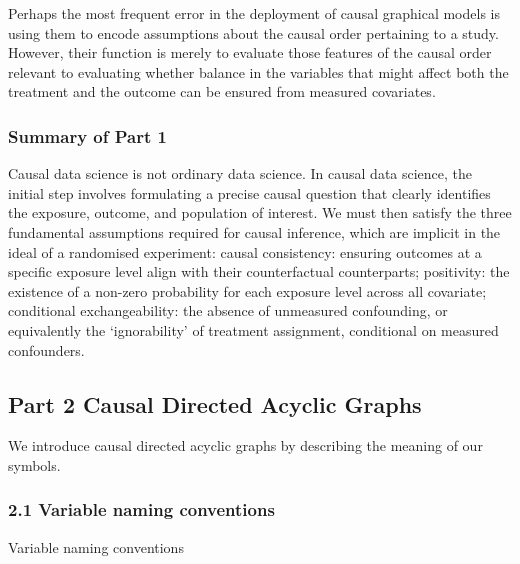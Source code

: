 \documentclass[
  single column]{article}
\begin{document}
Perhaps the most frequent error in the deployment of causal graphical
models is using them to encode assumptions about the causal order
pertaining to a study. However, their function is merely to evaluate
those features of the causal order relevant to evaluating whether
balance in the variables that might affect both the treatment and the
outcome can be ensured from measured covariates.

\subsubsection{Summary of Part 1}\label{summary-of-part-1}

Causal data science is not ordinary data science. In causal data
science, the initial step involves formulating a precise causal question
that clearly identifies the exposure, outcome, and population of
interest. We must then satisfy the three fundamental assumptions
required for causal inference, which are implicit in the ideal of a
randomised experiment: causal consistency: ensuring outcomes at a
specific exposure level align with their counterfactual counterparts;
positivity: the existence of a non-zero probability for each exposure
level across all covariate; conditional exchangeability: the absence of
unmeasured confounding, or equivalently the `ignorability' of treatment
assignment, conditional on measured confounders.

\newpage{}

\subsection{Part 2 Causal Directed Acyclic
Graphs}\label{part-2-causal-directed-acyclic-graphs}

We introduce causal directed acyclic graphs by describing the meaning of
our symbols.

\subsubsection{2.1 Variable naming
conventions}\label{variable-naming-conventions}

\begin{table}

\caption{\label{tbl-terminology}Variable naming conventions}

\centering{

\terminologylocalconventionssimple

}

\end{table}%
\end{document}
